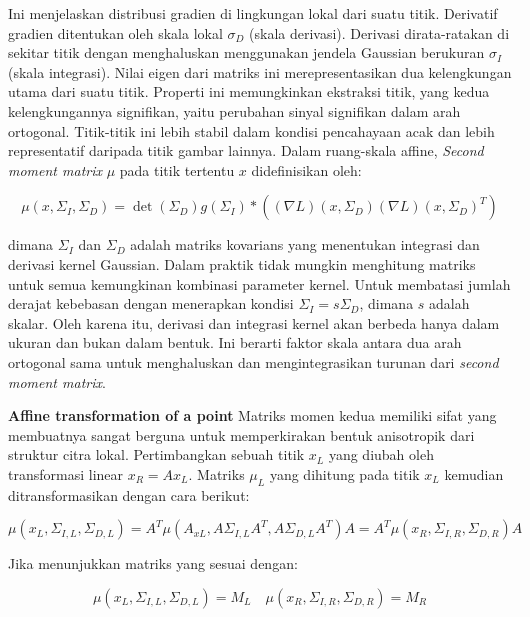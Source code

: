 Ini menjelaskan distribusi gradien di lingkungan lokal dari suatu titik. Derivatif gradien ditentukan 
oleh skala lokal \(\sigma_{D}\) (skala derivasi). Derivasi dirata-ratakan di sekitar titik dengan 
menghaluskan menggunakan jendela Gaussian berukuran \(\sigma_{I}\) (skala integrasi).
Nilai eigen dari matriks ini merepresentasikan dua kelengkungan utama dari suatu titik. 
Properti ini memungkinkan ekstraksi titik, yang kedua kelengkungannya signifikan, yaitu perubahan 
sinyal signifikan dalam arah ortogonal. Titik-titik ini lebih stabil dalam kondisi pencahayaan acak 
dan lebih representatif daripada titik gambar lainnya.
Dalam ruang-skala affine, \emph{Second moment matrix} \(\mu\) pada titik tertentu \(x\) didefinisikan oleh:

\begin{equation*}
  \mu(x, \Sigma_{I}, \Sigma_{D} ) = \det(\Sigma_{D})g(\Sigma_{I})* ((\nabla L)(x, \Sigma_{D})(\nabla L)(x, \Sigma_{D})^{T})
\end{equation*}

dimana \(\Sigma_{I}\) dan \(\Sigma_{D}\) adalah matriks kovarians yang menentukan integrasi dan 
derivasi kernel Gaussian. Dalam praktik tidak mungkin menghitung matriks untuk semua kemungkinan 
kombinasi parameter kernel. Untuk membatasi jumlah derajat kebebasan dengan menerapkan 
kondisi \(\Sigma_{I} = s\Sigma_{D}\), dimana \(s\) adalah skalar. Oleh karena itu, derivasi dan integrasi 
kernel akan berbeda hanya dalam ukuran dan bukan dalam bentuk. Ini berarti faktor skala antara dua arah ortogonal 
sama untuk menghaluskan dan mengintegrasikan turunan dari \emph{second moment matrix}.

\textbf{Affine transformation of a point} Matriks momen kedua memiliki sifat yang membuatnya sangat berguna 
untuk memperkirakan bentuk anisotropik dari struktur citra lokal. Pertimbangkan sebuah titik \(x_{L}\) yang 
diubah oleh transformasi linear \(x_{R} = Ax_{L}\). Matriks \(\mu_{L}\) yang dihitung pada titik \(x_{L}\) 
kemudian ditransformasikan dengan cara berikut:

\begin{equation}
  \mu(x_{L},\Sigma_{I,L},\Sigma_{D,L}) = A^{T}\mu(A_{xL},A\Sigma_{I,L}A^{T},A\Sigma_{D,L}A^{T})A = A^{T}\mu(x_{R},\Sigma_{I,R},\Sigma_{D,R})A
\end{equation}

Jika menunjukkan matriks yang sesuai dengan:

\begin{equation*}
  \mu(x_{L},\Sigma_{I,L},\Sigma_{D,L}) = M_{L} \quad \mu(x_{R},\Sigma_{I,R},\Sigma_{D,R}) = M_{R}
\end{equation*}


